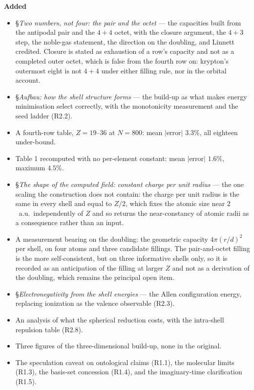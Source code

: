 \documentclass[11pt,a4paper]{article}
\begin{document}
\textbf{Added}
\begin{itemize}
  \item §\emph{Two numbers, not four: the pair and the octet} --- the capacities built from the antipodal pair and
    the $4{+}4$ octet, with the closure argument, the $4{+}3$ step, the noble-gas statement, the
    direction on the doubling, and Linnett credited. Closure is stated as exhaustion of a row's
    capacity and not as a completed outer octet, which is false from the fourth row on: krypton's
    outermost eight is not $4{+}4$ under either filling rule, nor in the orbital account.
  \item §\emph{Aufbau: how the shell structure forms} --- the build-up as what makes energy minimisation select
    correctly, with the monotonicity measurement and the seed ladder (R2.2).
  \item A fourth-row table, $Z=19$--$36$ at $N=800$: mean $|$error$|$ $3.3\%$, all eighteen under-bound.
  \item Table 1 recomputed with no per-element constant: mean $|$error$|$ $1.6\%$, maximum $4.5\%$.
  \item §\emph{The shape of the computed field: constant charge per unit radius} --- the one scaling
    the construction does not contain: the charge per unit radius is the same in every shell and equal
    to $Z/2$, which fixes the atomic size near $2$~a.u.\ independently of $Z$ and so returns the
    near-constancy of atomic radii as a consequence rather than an input.
  \item A measurement bearing on the doubling: the geometric capacity $4\pi(r/d)^2$ per shell, on four
    atoms and three candidate fillings. The pair-and-octet filling is the more self-consistent, but on
    three informative shells only, so it is recorded as an anticipation of the filling at larger $Z$
    and not as a derivation of the doubling, which remains the principal open item.
  \item §\emph{Electronegativity from the shell energies} --- the Allen configuration energy, replacing ionization
    as the valence observable (R2.3).
  \item An analysis of what the spherical reduction costs, with the intra-shell repulsion table (R2.8).
  \item Three figures of the three-dimensional build-up, none in the original.
  \item The speculation caveat on ontological claims (R1.1), the molecular limits (R1.3), the basis-set
    concession (R1.4), and the imaginary-time clarification (R1.5).
\end{itemize}
\end{document}

